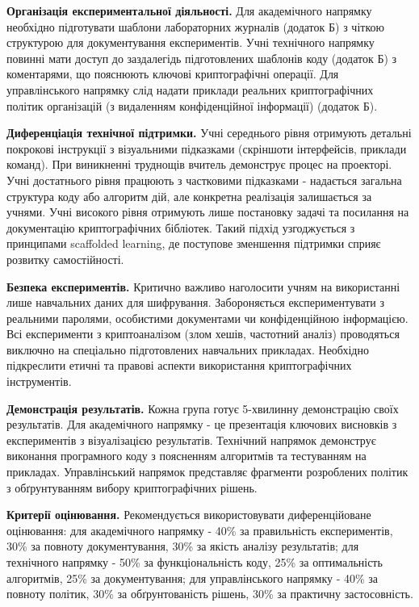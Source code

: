 \textbf{Організація експериментальної діяльності.} Для академічного напрямку необхідно підготувати шаблони лабораторних журналів (додаток Б) з чіткою структурою для документування експериментів. Учні технічного напрямку повинні мати доступ до заздалегідь підготовлених шаблонів коду (додаток Б) з коментарями, що пояснюють ключові криптографічні операції. Для управлінського напрямку слід надати приклади реальних криптографічних політик організацій (з видаленням конфіденційної інформації) (додаток Б). 

\textbf{Диференціація технічної підтримки.} Учні середнього рівня отримують детальні покрокові інструкції з візуальними підказками (скріншоти інтерфейсів, приклади команд). При виникненні труднощів вчитель демонструє процес на проекторі. Учні достатнього рівня працюють з частковими підказками - надається загальна структура коду або алгоритм дій, але конкретна реалізація залишається за учнями. Учні високого рівня отримують лише постановку задачі та посилання на документацію криптографічних бібліотек. Такий підхід узгоджується з принципами scaffolded learning, де поступове зменшення підтримки сприяє розвитку самостійності.

\textbf{Безпека експериментів. }Критично важливо наголосити учням на використанні лише навчальних даних для шифрування. Забороняється експериментувати з реальними паролями, особистими документами чи конфіденційною інформацією. Всі експерименти з криптоаналізом (злом хешів, частотний аналіз) проводяться виключно на спеціально підготовлених навчальних прикладах. Необхідно підкреслити етичні та правові аспекти використання криптографічних інструментів. 

\textbf{Демонстрація результатів.} Кожна група готує 5-хвилинну демонстрацію своїх результатів. Для академічного напрямку - це презентація ключових висновків з експериментів з візуалізацією результатів. Технічний напрямок демонструє виконання програмного коду з поясненням алгоритмів та тестуванням на прикладах. Управлінський напрямок представляє фрагменти розроблених політик з обґрунтуванням вибору криптографічних рішень. 

\textbf{Критерії оцінювання.} Рекомендується використовувати диференційоване оцінювання: для академічного напрямку - 40\% за правильність експериментів, 30\% за повноту документування, 30\% за якість аналізу результатів; для технічного напрямку - 50\% за функціональність коду, 25\% за оптимальність алгоритмів, 25\% за документування; для управлінського напрямку - 40\% за повноту політик, 30\% за обґрунтованість рішень, 30\% за практичну застосовність.

